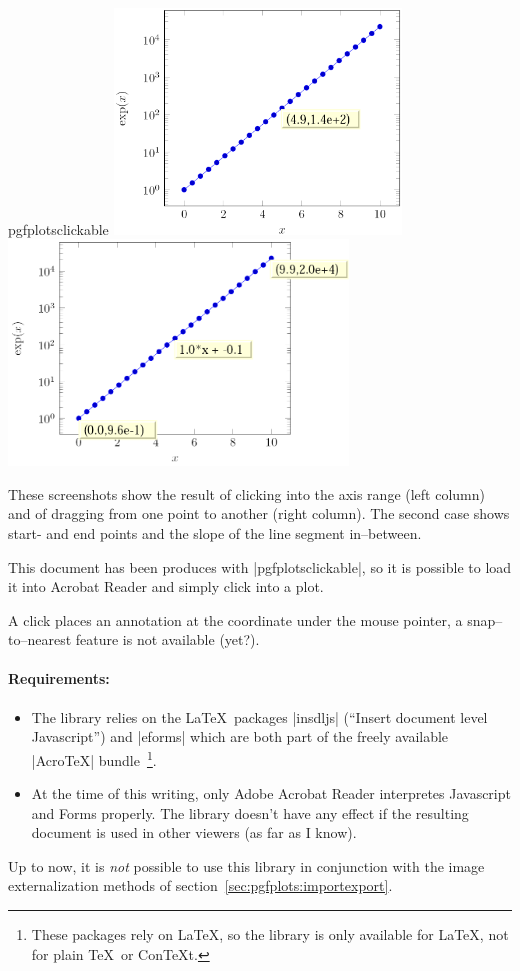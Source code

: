 \begin{tikzlibrary}{pgfplotsclickable}
	\includegraphics[height=6cm]{figures/pgfplotsclickable-fig3.png}
	\includegraphics[height=6cm]{figures/pgfplotsclickable-fig4.png}

	\nobreak
	These screenshots show the result of clicking into the axis range (left column) and of dragging from one point to another (right column). The second case shows start- and end points and the slope of the line segment in--between.

	This document has been produces with |pgfplotsclickable|, so it is possible to load it into Acrobat Reader and simply click into a plot.

	A click places an annotation at the coordinate under the mouse pointer, a snap--to--nearest feature is not available (yet?).

	\paragraph{Requirements:}
	\begin{itemize}
		\item The library relies on the \LaTeX\ packages |insdljs| (``Insert document level Javascript'') and |eforms| which are both part of the freely available |AcroTeX| bundle~\cite{acrotex}\footnote{These packages rely on \LaTeX, so the library is only available for \LaTeX, not for plain \TeX\ or Con\TeX t.}.
		
		\item At the time of this writing, only Adobe Acrobat Reader interpretes Javascript and Forms properly. The library doesn't have any effect if the resulting document is used in other viewers (as far as I know).
	\end{itemize}

	Up to now, it is \emph{not} possible to use this library in conjunction with the image externalization methods of section~\ref{sec:pgfplots:importexport}.
\end{tikzlibrary}

